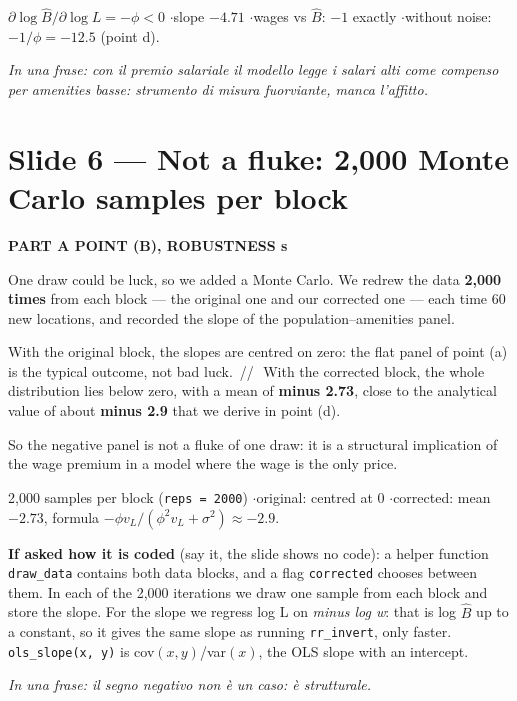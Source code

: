 \documentclass[11pt,a4paper]{article}
\newcommand{\slide}[3]{\Needspace{14\baselineskip}\section{#1}\textcolor{unicared}{\small\bfseries\MakeUppercase{#3}\quad\textperiodcentered\quad #2}\par}
\newcommand{\idea}[1]{\par{\small\itshape\color{unicablue}In una frase: #1}\par}
\newcommand{\pause}{\textcolor{unicared}{\,/\!/\,}}
\begin{document}
\begin{nums}
$\partial\log\hat B/\partial\log L = -\phi < 0$ \quad$\cdot$\quad slope $-4.71$ \quad$\cdot$\quad wages vs $\hat B$: $-1$ exactly \quad$\cdot$\quad without noise: $-1/\phi = -12.5$ (point d).
\end{nums}
\idea{con il premio salariale il modello legge i salari alti come compenso per amenities basse: strumento di misura fuorviante, manca l'affitto.}

\slide{Slide 6 --- Not a fluke: 2,000 Monte Carlo samples per block}{50 s}{Part A \textperiodcentered{} point (b), robustness}

\begin{say}
One draw could be luck, so we added a Monte Carlo. We redrew the data \textbf{2,000 times} from each block --- the original one and our corrected one --- each time 60 new locations, and recorded the slope of the population--amenities panel.

With the original block, the slopes are centred on zero: the flat panel of point (a) is the typical outcome, not bad luck. \pause\ With the corrected block, the whole distribution lies below zero, with a mean of \textbf{minus 2.73}, close to the analytical value of about \textbf{minus 2.9} that we derive in point (d).

So the negative panel is not a fluke of one draw: it is a structural implication of the wage premium in a model where the wage is the only price.
\end{say}

\begin{nums}
2,000 samples per block (\texttt{reps = 2000}) \quad$\cdot$\quad original: centred at 0 \quad$\cdot$\quad corrected: mean $-2.73$, formula $-\phi v_L/(\phi^2 v_L+\sigma^2) \approx -2.9$.
\end{nums}
\begin{ask}
\textbf{If asked how it is coded} (say it, the slide shows no code): a helper function \texttt{draw\_data} contains both data blocks, and a flag \texttt{corrected} chooses between them. In each of the 2,000 iterations we draw one sample from each block and store the slope. For the slope we regress log L on \emph{minus log w}: that is log $\hat B$ up to a constant, so it gives the same slope as running \texttt{rr\_invert}, only faster. \texttt{ols\_slope(x, y)} is cov$(x,y)$/var$(x)$, the OLS slope with an intercept.
\end{ask}
\idea{il segno negativo non è un caso: è strutturale.}
\end{document}
